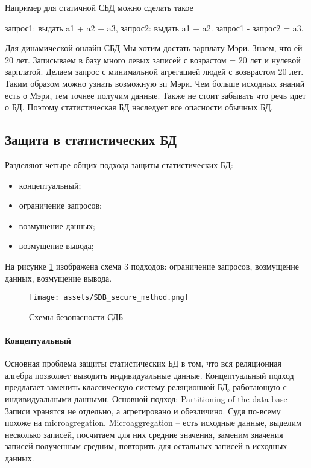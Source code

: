 Например для статичной СБД можно сделать такое

запрос1: выдать a1 + a2 + a3, запрос2: выдать a1 + a2. запрос1 - запрос2 = a3.

Для динамической онлайн СБД
Мы хотим достать зарплату Мэри. Знаем, что ей 20 лет. Записываем в базу много левых записей с возрастом = 20 лет и нулевой зарплатой. Делаем запрос с минимальной агрегацией людей с возврастом 20 лет. Таким образом можно узнать возможную зп Мэри. Чем больше исходных знаний есть о Мэри, тем точнее получим данные.
Также не стоит забывать что речь идет о БД. Поэтому статистическая БД наследует все опасности обычных БД.

  \subsection{Защита в статистических БД}

Разделяют четыре общих подхода защиты статистических БД:
\begin{itemize}
  \item концептуальный;
	\item ограничение запросов;
	\item возмущение данных;
	\item возмущение вывода;
\end{itemize}
На рисунке \ref{fig:SDB_secure} изображена схема 3 подходов: ограничение запросов, возмущение данных, возмущение вывода.
\begin{figure}[h]
    \centering
    \texttt{[image: assets/SDB\_secure\_method.png]}
    \caption{Схемы безопасности СДБ}
    \label{fig:SDB_secure}
\end{figure}
\paragraph{Концептуальный}

Основная проблема защиты статистических БД в том, что вся реляционная алгебра позволяет выводить индивидуальные данные. Концептуальный подход предлагает заменить классическую систему реляционной БД, работающую с индивидуальными данными.
Основной подход:
Partitioning of the data base -- Записи хранятся не отдельно, а агрегировано и обезличино. Судя по-всему похоже на microagregation.
Microaggregation -- есть исходные данные, выделим несколько записей, посчитаем для них средние значения, заменим значения записей полученным средним, повторить для остальных записей в исходных данных.

